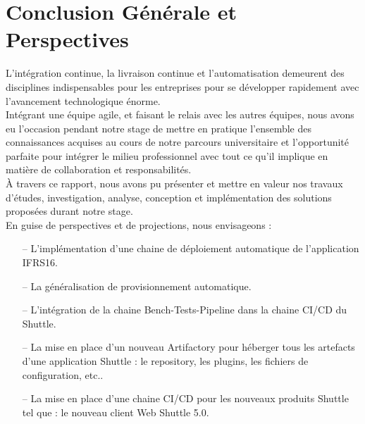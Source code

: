 \chapter{Conclusion Générale et Perspectives}
\pagestyle{fancy}
\fancyhf{}
\fancyhead[R]{\bfseries\rightmark}
\fancyfoot[R]{\thepage}
\renewcommand{\headrulewidth}{0.5pt}
\renewcommand{\footrulewidth}{0pt}
\renewcommand{\chaptermark}[1]{\markboth{\MakeUppercase{\chaptername~\thechapter. #1 }}{}}
\renewcommand{\sectionmark}[1]{\markright{\thechapter.\thesection~ #1}}

\begin{spacing}{1.2}
L'intégration continue, la livraison continue et l'automatisation demeurent des disciplines indispensables pour les entreprises pour se développer rapidement avec l'avancement technologique énorme.\\

Intégrant une équipe agile, et faisant le relais avec les autres équipes, nous avons eu l'occasion pendant notre stage de mettre en pratique l’ensemble des connaissances acquises au cours de notre parcours universitaire et l'opportunité parfaite pour intégrer le milieu professionnel avec tout ce qu’il implique en matière de collaboration et responsabilités.\\

À travers ce rapport, nous avons pu présenter et mettre en valeur nos travaux d'études, investigation, analyse, conception et implémentation des solutions proposées durant notre stage. \\

En guise de perspectives et de projections, nous envisageons : 
\begin{itemize}
    \setlength\itemsep{0em}
    \item[--] L'implémentation d'une chaine de déploiement automatique de l'application IFRS16.
    \item[--] La généralisation de provisionnement automatique.
    \item[--] L'intégration de la chaine Bench-Tests-Pipeline dans la chaine CI/CD du Shuttle. 
    \item[--] La mise en place d'un nouveau Artifactory pour héberger tous les artefacts d'une application Shuttle : le repository, les plugins, les fichiers de configuration, etc..
    \item[--] La mise en place d'une chaine CI/CD pour les nouveaux produits Shuttle tel que : le nouveau client Web Shuttle 5.0. 
\end{itemize}

\end{spacing}